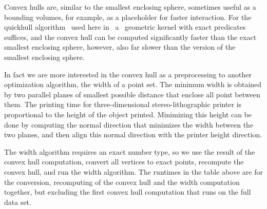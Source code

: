Convex hulls are, similar to the smallest enclosing sphere, sometimes
useful as a bounding volumes, for example, as a placeholder for faster
interaction. For the quickhull algorithm~\cite{bdh-qach-96} used here
in \cgal\ a \cgal\ geometric kernel with exact predicates suffices,
and the convex hull can be computed significantly faster than the
exact smallest enclosing sphere, however, also far slower than the
 version of the smallest enclosing sphere.

In fact we are more interested in the convex hull as a preprocessing
to another optimization algorithm, the width of a point set. The
minimum width is obtained by two parallel planes of smallest possible
distance that enclose all point between them. The printing time for
three-dimensional stereo-lithographic printer is proportional to the
height of the object printed. Minimizing this height can be done by
computing the normal direction that minimizes the width between the
two planes, and then align this normal direction with the printer
height direction.

The width algorithm requires an exact number type, so we use the
result of the convex hull computation, convert all vertices to exact
points, recompute the convex hull, and run the width algorithm. The
runtimes in the table above are for the conversion, recomputing of the
convex hull and the width computation together, but excluding the
first convex hull computation that runs on the full data set.



